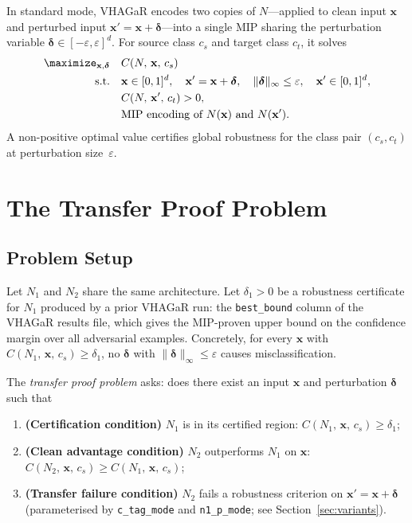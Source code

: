 \documentclass[11pt,a4paper]{article}
\theoremstyle{definition}
\theoremstyle{plain}
\newcommand{\Conf}[3]{C(#1,\,#2,\,#3)}
\newcommand{\NN}[1]{N_{#1}}
\newcommand{\vx}{\mathbf{x}}
\newcommand{\ve}{\boldsymbol{\delta}}
\newcommand{\vxp}{\mathbf{x}'}
\newcommand{\eps}{\varepsilon}
\newcommand{\deltaone}{\delta_1}
\begin{document}
In standard mode, VHAGaR encodes two copies of $N$---applied to clean input $\vx$ and perturbed input $\vxp = \vx + \ve$---into a single MIP sharing the perturbation variable $\ve \in [-\eps,\eps]^d$. For source class $c_s$ and target class $c_t$, it solves
\begin{align}
  \maximize_{\vx, \ve} \quad & \Conf{N}{\vx}{c_s} \\
  \mathrm{s.t.} \quad
    & \vx \in [0,1]^d, \quad \vxp = \vx + \ve, \quad \|\ve\|_\infty \le \eps, \quad \vxp \in [0,1]^d, \nonumber \\
    & \Conf{N}{\vxp}{c_t} > 0, \nonumber \\
    & \text{MIP encoding of } N(\vx) \text{ and } N(\vxp). \nonumber
\end{align}
A non-positive optimal value certifies global robustness for the class pair $(c_s,c_t)$ at perturbation size~$\eps$.

\section{The Transfer Proof Problem}
\label{sec:problem}

\subsection{Problem Setup}

Let $\NN{1}$ and $\NN{2}$ share the same architecture. Let $\deltaone > 0$ be a robustness certificate for $\NN{1}$ produced by a prior VHAGaR run: the \texttt{best\_bound} column of the VHAGaR results file, which gives the MIP-proven upper bound on the confidence margin over all adversarial examples. Concretely, for every $\vx$ with $\Conf{\NN{1}}{\vx}{c_s} \ge \deltaone$, no $\ve$ with $\|\ve\|_\infty \le \eps$ causes misclassification.

The \emph{transfer proof problem} asks: does there exist an input $\vx$ and perturbation $\ve$ such that
\begin{enumerate}
  \item \textbf{(Certification condition)} $\NN{1}$ is in its certified region: $\Conf{\NN{1}}{\vx}{c_s} \ge \deltaone$;
  \item \textbf{(Clean advantage condition)} $\NN{2}$ outperforms $\NN{1}$ on $\vx$: $\Conf{\NN{2}}{\vx}{c_s} \ge \Conf{\NN{1}}{\vx}{c_s}$;
  \item \textbf{(Transfer failure condition)} $\NN{2}$ fails a robustness criterion on $\vxp = \vx + \ve$ (parameterised by \texttt{c\_tag\_mode} and \texttt{n1\_p\_mode}; see Section~\ref{sec:variants}).
\end{enumerate}
\end{document}

